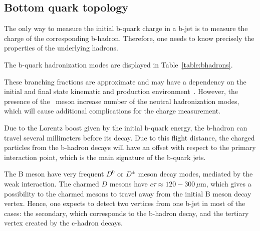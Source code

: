 

\subsection{Bottom quark topology}
The only way to measure the initial b-quark charge in a b-jet is to measure the charge of the corresponding b-hadron. 
Therefore, one needs to know precisely the properties of the underlying hadrons. 


The b-quark hadronization modes are displayed in Table~\ref{table:bhadrons}.


These branching fractions are approximate and may have a dependency on the initial and final state kinematic and production environment~\cite{bib:PDG}.
However, the presence of the \Bzs\ meson increase number of the neutral hadronization modes, which will cause additional complications for the charge measurement. 

Due to the Lorentz boost given by the initial b-quark energy, the b-hadron can travel several millimeters before its decay. Due to this flight distance, the charged particles from the b-hadron decays will have an offset with respect to the primary interaction point, which is the main signature of the b-quark jets. 

The B meson have very frequent $D^0$ or $D^\pm$ meson decay modes, mediated by the weak interaction. The charmed $D$ mesons have $c\tau \approx 120 - 300$\,$\mu$m, which gives a possibility to the charmed mesons to travel away from the initial B meson decay vertex. 
Hence, one expects to detect two vertices from one b-jet in most of the cases: the secondary, which corresponds to the b-hadron decay, and the tertiary vertex created by the c-hadron decays. 

